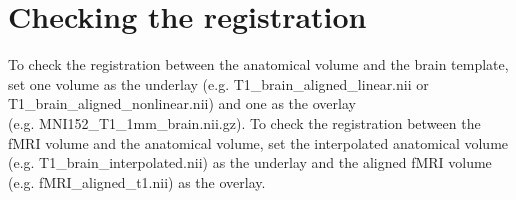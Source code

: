 \section{Checking the registration}

To check the registration between the anatomical volume and the brain template, set one volume as the underlay (e.g. T1\_brain\_aligned\_linear.nii or T1\_brain\_aligned\_nonlinear.nii) and one as the overlay \\ (e.g. MNI152\_T1\_1mm\_brain.nii.gz). To check the registration between the fMRI volume and the anatomical volume, set the interpolated anatomical volume (e.g. T1\_brain\_interpolated.nii) as the underlay and the aligned fMRI volume (e.g. fMRI\_aligned\_t1.nii) as the overlay.








